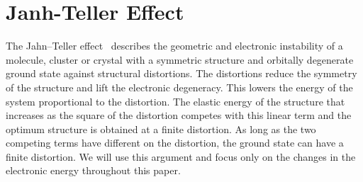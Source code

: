 \documentclass[a4paper,prb]{revtex4-1}  %
\newcommand{\com}[1]{}
\newcommand{\az}[1]{{\color{magenta}{#1}}} %
\begin{document}
\com{
$V_{oct}(\vec r)$ causes the d-orbitals to split into two manifolds,
$t_{2g}$  and $e_g$, where $t_{2g}$ contains three degenerate states ($xy,yz,zx$) while $e_g$ has two degenerate states ($x^2-y^2,z^2$).
The crystal field splitting between the two manifolds is
${\Delta=\frac{160}{3}\frac{q_o}{a} D_{4}}$.
\az{We will see how these degeneracies are lifted as we elongate (or compress)
the octahedron along a ....??}
}


\section{Janh-Teller Effect}

The Jahn--Teller effect~\cite{Jahn-Teller} describes the 
geometric and electronic instability of a %
molecule, cluster or crystal with
a symmetric structure and orbitally degenerate ground state
against structural distortions.
The distortions  
reduce the symmetry of the structure
and lift the electronic degeneracy.
This lowers the energy of the system proportional to
the distortion.
The elastic energy of the structure that increases as the square of the distortion
competes with this linear term and the optimum structure 
is obtained at a finite distortion.
As long as the two competing terms have different \az{[dependence, exponent? diff order polynomial?]} on the distortion,
the ground state can have a finite distortion.
We will use this argument and focus only on the changes
 in the electronic energy throughout this paper.

\az{For our main problem, the rigid octahedral rotations in perovskites,
we will see that 
the energies are quadratic with the tilt and rotation angles. 
However, the unit cell volume also changes quadratically with the angles 
so the elastic energy still goes with a doubled power of this ``distortion'',
i.e, it should be quartic in the angles.
So the two will lead to an optimum structure with a finite tilt and rotation.
}
\end{document}
